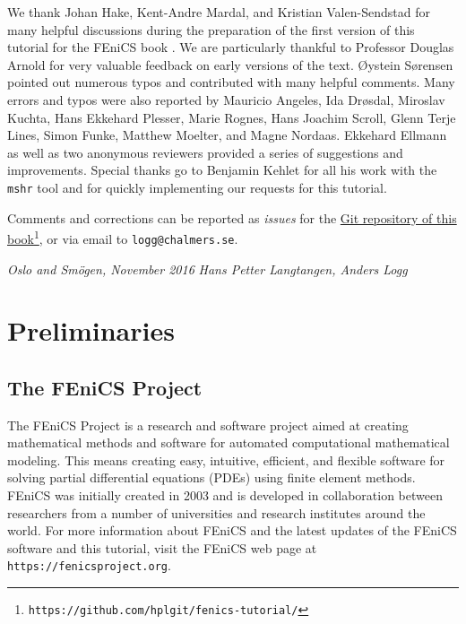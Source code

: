 \documentclass[graybox,envcountchap,sectrefs,final]{svmonodo}
\begin{document}
We thank Johan Hake, Kent-Andre Mardal, and Kristian Valen-Sendstad
for many helpful discussions during the preparation of the first
version of this tutorial for the FEniCS book \cite{FEniCS}. We are
particularly thankful to Professor Douglas Arnold for very valuable
feedback on early versions of the text.  Øystein Sørensen pointed out
numerous typos and contributed with many helpful comments. Many errors
and typos were also reported by Mauricio Angeles, Ida Drøsdal,
Miroslav Kuchta, Hans Ekkehard Plesser, Marie Rognes, Hans Joachim
Scroll, Glenn Terje Lines, Simon Funke, Matthew Moelter, and Magne
Nordaas. Ekkehard Ellmann as well as two anonymous reviewers provided
a series of suggestions and improvements.  Special thanks go to
Benjamin Kehlet for all his work with the \texttt{mshr} tool and for quickly
implementing our requests for this tutorial.

Comments and corrections can be reported as \emph{issues} for the
\href{{https://github.com/hplgit/fenics-tutorial/}}{Git repository of this book}\footnote{\texttt{https://github.com/hplgit/fenics-tutorial/}},
or via email
to \texttt{logg@chalmers.se}.

\vspace{1cm}

\noindent
{\it Oslo and Smögen, November 2016} \hfill  {\it Hans Petter Langtangen, Anders Logg}

\chapter{Preliminaries}
\label{ch:prelim}

\section{The FEniCS Project}

The FEniCS Project is a research and software project aimed at
creating mathematical methods and software for automated computational
mathematical modeling. This means creating easy, intuitive, efficient,
and flexible software for solving partial differential equations
(PDEs) using finite element methods. FEniCS was initially created in
2003 and is developed in collaboration between researchers from a
number of universities and research institutes around the world. For
more information about FEniCS and the latest updates of the FEniCS
software and this tutorial, visit the FEniCS web page at
\texttt{https://fenicsproject.org}.

\end{document}
